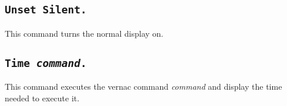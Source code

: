 \subsection{\tt Unset Silent.}
This command turns the normal display on.

\subsection{\tt Time \textrm{\textsl{command}}.}
\label{time}
This command executes the vernac command \textrm{\textsl{command}}
and display the time needed to execute it.





